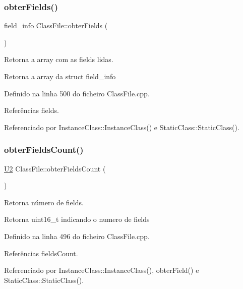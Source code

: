 \subsubsection{\texorpdfstring{obter\+Fields()}{obterFields()}}
{\footnotesize\ttfamily field\+\_\+info Class\+File\+::obter\+Fields (\begin{DoxyParamCaption}{ }\end{DoxyParamCaption})}



Retorna a array com as fields lidas. 

\begin{DoxyReturn}{Retorna}
a array da struct field\+\_\+info 
\end{DoxyReturn}


Definido na linha 500 do ficheiro Class\+File.\+cpp.



Referências fields.



Referenciado por Instance\+Class\+::\+Instance\+Class() e Static\+Class\+::\+Static\+Class().

\mbox{\label{classClassFile_a0be559cd8b7b3168c81a2782e4facb0c}} 
\subsubsection{\texorpdfstring{obter\+Fields\+Count()}{obterFieldsCount()}}
{\footnotesize\ttfamily \hyperlink{BasicTypes_8h_a90240657108b1b457eef9d3f76e0202e}{U2} Class\+File\+::obter\+Fields\+Count (\begin{DoxyParamCaption}{ }\end{DoxyParamCaption})}



Retorna número de fields. 

\begin{DoxyReturn}{Retorna}
uint16\+\_\+t indicando o numero de fields 
\end{DoxyReturn}


Definido na linha 496 do ficheiro Class\+File.\+cpp.



Referências fields\+Count.



Referenciado por Instance\+Class\+::\+Instance\+Class(), obter\+Field() e Static\+Class\+::\+Static\+Class().

